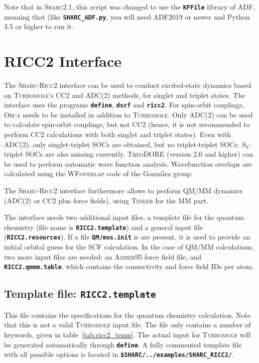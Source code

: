 \documentclass[a4paper,10pt,DIV=15,openany]{scrbook}
\newcommand{\sharc}{\textsc{Sharc}}
\newcommand{\ttt}[1]{\textbf{\texttt{#1}}}
\begin{document}
Note that in \sharc2.1, this script was changed to use the \ttt{KFFile} library of ADF, meaning that (like \ttt{SHARC\_ADF.py}, you will need ADF2019 or newer and Python 3.5 or higher to run it.



\section{RICC2 Interface}\label{sec:int:ricc2}

The \sharc-\textsc{Ricc2} interface can be used to conduct excited-state dynamics based on \textsc{Turbomole}'s CC2 and ADC(2) methods, for singlet and triplet states.
The interface uses the programs \ttt{define}, \ttt{dscf} and \ttt{ricc2}.
For spin-orbit couplings, \textsc{Orca} needs to be installed in addition to \textsc{Turbomole}.
Only ADC(2) can be used to calculate spin-orbit couplings, but not CC2 (hence, it is not recommended to perform CC2 calculations with both singlet and triplet states).
Even with ADC(2), only singlet-triplet SOCs are obtained, but no triplet-triplet SOCs; $S_0$-triplet SOCs are also missing currently.
\textsc{TheoDORE} (version 2.0 and higher) can be used to perform automatic wave function analysis.
Wavefunction overlaps are calculated using the \textsc{WFoverlap} code of the Gonz\'alez group.\cite{Plasser2016JCTC}

The \sharc-\textsc{Ricc2} interface furthermore allows to perform QM/MM dynamics (ADC(2) or CC2 plus force fields), using \textsc{Tinker} for the MM part.

The interface needs two additional input files, a template file for the quantum chemistry (file name is \ttt{RICC2.template}) and a general input file (\ttt{RICC2.resources}). 
If a file \ttt{QM/mos.init} is are present, it is used to provide an initial orbital guess for the SCF calculation.
In the case of QM/MM calculations, two more input files are needed: an \textsc{Amber}95 force field file, and \ttt{RICC2.qmmm.table}, which contains the connectivity and force field IDs per atom.


\subsection{Template file: \ttt{RICC2.template}}

This file contains the specifications for the quantum chemistry calculation. Note that this is not a valid \textsc{Turbomole} input file. The file only contains a number of keywords, given in table~\ref{tab:ricc2_temp}. The actual input for \textsc{Turbomole} will be generated automatically through \ttt{define}.
A fully commented template file with all possible options is located in \ttt{\$SHARC/../examples/SHARC\_RICC2/}.
\end{document}
